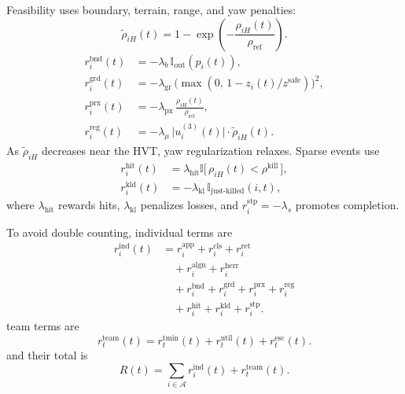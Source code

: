 \documentclass{cja}
\begin{document}
Feasibility uses boundary, terrain, range, and yaw penalties:
\begin{equation}
\widetilde\rho_{iH}(t)
=
1-
\exp\!\left(-\frac{\rho_{iH}(t)}{\rho_{\mathrm{ref}}}\right).
\end{equation}
\begin{align}
r_i^{\mathrm{bnd}}(t)&=-\lambda_b\,\mathbb{I}_{\mathrm{out}}(p_i(t)),
\label{eq:r-bnd}\\
r_i^{\mathrm{grd}}(t)&=-\lambda_{\mathrm{gr}}\,\bigl(\max(0,\,1-z_i(t)/z^{\mathrm{safe}})\bigr)^{2},
\label{eq:r-grd}\\
r_i^{\mathrm{prx}}(t)&=-\lambda_{\mathrm{px}}\,\frac{\rho_{iH}(t)}{\rho_{\mathrm{ref}}},
\label{eq:r-prx}\\
r_i^{\mathrm{reg}}(t)&=-\lambda_{\mu}\,\bigl|u_i^{(3)}(t)\bigr|\cdot \widetilde\rho_{iH}(t).
\label{eq:r-reg}
\end{align}
As $\widetilde\rho_{iH}$ decreases near the HVT, yaw regularization relaxes. Sparse events use
\begin{equation}
\begin{aligned}
r_i^{\mathrm{hit}}(t)
&=\lambda_{\mathrm{hit}}\mathbb{I}\bigl[\,\rho_{iH}(t)<\rho^{\mathrm{kill}}\,\bigr],\\
r_i^{\mathrm{kld}}(t)
&=-\lambda_{\mathrm{kl}}\,\mathbb{I}_{\text{just-killed}}(i,t),
\end{aligned}
\label{eq:r-event}
\end{equation}
where $\lambda_{\mathrm{hit}}$ rewards hits, $\lambda_{\mathrm{kl}}$ penalizes losses, and $r_i^{\mathrm{stp}}=-\lambda_s$ promotes completion.

To avoid double counting, individual terms are
\begin{equation}
\begin{aligned}
r_i^{\mathrm{ind}}(t)
&=
{r_i^{\mathrm{app}}+r_i^{\mathrm{cls}}+r_i^{\mathrm{ret}}}\\
&\quad
+{r_i^{\mathrm{algn}}+r_i^{\mathrm{herr}}}\\
&\quad
+{r_i^{\mathrm{bnd}}+r_i^{\mathrm{grd}}+r_i^{\mathrm{prx}}+r_i^{\mathrm{reg}}}\\
&\quad
+r_i^{\mathrm{hit}}+r_i^{\mathrm{kld}}+r_i^{\mathrm{stp}}.
\end{aligned}
\label{eq:r-ind}
\end{equation}
team terms are
\begin{equation}
r_t^{\mathrm{team}}(t)
=
r_t^{\mathrm{tmin}}(t)
+
r_t^{\mathrm{util}}(t)
+
r_t^{\mathrm{esc}}(t).
\end{equation}
and their total is
\begin{equation}
R(t)=\sum_{i\in\mathcal{A}}r_i^{\mathrm{ind}}(t)+r_t^{\mathrm{team}}(t).
\label{eq:r-total}
\end{equation}
\end{document}
